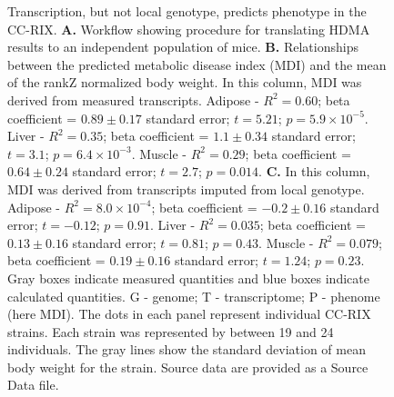 \documentclass[
]{article}
\begin{document}
\begin{figure}[ht!]
\caption{Transcription, but not local genotype, predicts 
phenotype in the CC-RIX. \textbf{A.} Workflow showing 
procedure for translating HDMA results to an independent 
population of mice. \textbf{B.} Relationships between the 
predicted metabolic disease index (MDI) and the mean
of the rankZ normalized body weight. In this column,
MDI was derived from measured transcripts. Adipose - 
$R^2 = 0.60$;  beta coefficient = $0.89\pm0.17$ 
standard error; $t = 5.21$; $p = 5.9\times10^{-5}$.
Liver - $R^2 = 0.35$;  beta coefficient = $1.1\pm0.34$ 
standard error; $t = 3.1$; $p = 6.4\times10^{-3}$.
Muscle - $R^2 = 0.29$;  beta coefficient = $0.64\pm0.24$ 
standard error; $t = 2.7$; $p = 0.014$.
\textbf{C.} In this column, MDI was derived from 
transcripts imputed from local genotype. Adipose - 
$R^2 = 8.0\times10^{-4}$;  beta coefficient = $-0.2\pm0.16$ 
standard error; $t = -0.12$; $p = 0.91$.
Liver - $R^2 = 0.035$;  beta coefficient = $0.13\pm0.16$ 
standard error; $t = 0.81$; $p = 0.43$.
Muscle - $R^2 = 0.079$;  beta coefficient = $0.19\pm0.16$ 
standard error; $t = 1.24$; $p = 0.23$.
Gray boxes indicate measured quantities and blue boxes 
indicate calculated quantities. G - genome; T - transcriptome; 
P - phenome (here MDI). The dots in each panel represent 
individual CC-RIX strains. Each strain was represented 
by between 19 and 24 individuals. The gray lines show 
the standard deviation of mean body weight for the 
strain. Source data are provided as a Source Data 
file.
}
\label{fig:cc_prediction}
\end{figure}
\end{document}
